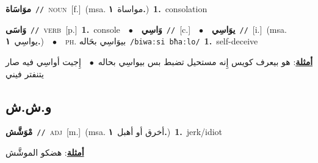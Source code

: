 \documentclass[10pt,a4paper,twoside]{article} %
\begin{document}
\begin{multicols}{2}
{\setlength\topsep{0pt}\textbf{\foreignlanguage{arabic}{موَاسَاة}}\ {\color{gray}\texttt{//}\color{black}}\ \textsc{noun}\ [f.]\ \color{gray}(msa. \foreignlanguage{arabic}{مواساة}~\foreignlanguage{arabic}{\textbf{١.}})\color{black}\ \textbf{1.}~consolation\ } \vspace{2mm}

{\setlength\topsep{0pt}\textbf{\foreignlanguage{arabic}{وَاسَى}}\ {\color{gray}\texttt{//}\color{black}}\ \textsc{verb}\ [p.]\ \textbf{1.}~console\ \ $\bullet$\ \ \setlength\topsep{0pt}\textbf{\foreignlanguage{arabic}{وَاسِي}}\ {\color{gray}\texttt{//}\color{black}}\ [c.]\ \ $\bullet$\ \ \setlength\topsep{0pt}\textbf{\foreignlanguage{arabic}{يوَاسِي}}\ {\color{gray}\texttt{//}\color{black}}\ [i.]\ \color{gray}(msa. \foreignlanguage{arabic}{يواسِي}~\foreignlanguage{arabic}{\textbf{١.}})\color{black}\ \ $\bullet$\ \ \textsc{ph.} \color{gray} \foreignlanguage{arabic}{بيوَاسِي بحَاله}\color{black}\ {\color{gray}\texttt{/{\sffamily biwaːsi bħaːlo}/}\color{black}}\ \textbf{1.}~self-deceive\  \begin{flushright}\color{gray}\foreignlanguage{arabic}{\textbf{\underline{\foreignlanguage{arabic}{أمثلة}}}: هو بيعرف كويس إِنه مستحيل تضبط بس بيواسِي بحاله\ $\bullet$\ \  إِجيت أواسِي فيه صار يتنفتر فيني}\end{flushright}\color{black}} \vspace{2mm}

\vspace{-3mm}
\subsection*{\color{blue}\foreignlanguage{arabic}{و.ش.ش}\color{blue}{}} 

{\setlength\topsep{0pt}\textbf{\foreignlanguage{arabic}{مْوَشَّش}}\ {\color{gray}\texttt{//}\color{black}}\ \textsc{adj}\ [m.]\ \color{gray}(msa. \foreignlanguage{arabic}{أخرق أو أهبل}~\foreignlanguage{arabic}{\textbf{١.}})\color{black}\ \textbf{1.}~jerk/idiot\  \begin{flushright}\color{gray}\foreignlanguage{arabic}{\textbf{\underline{\foreignlanguage{arabic}{أمثلة}}}: هضكو الموشَّش}\end{flushright}\color{black}} \vspace{2mm}


\end{multicols}
\end{document}
